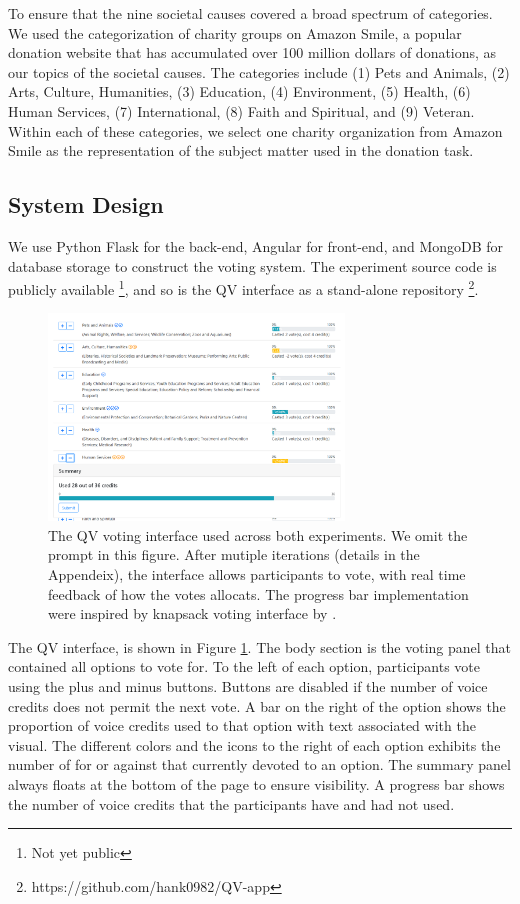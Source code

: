 To ensure that the nine societal causes 
covered a broad spectrum of categories.
We used the categorization of charity groups on Amazon Smile, 
a popular donation website that has accumulated over 100 million dollars of donations, 
as our topics of the societal causes.
The categories include (1) Pets and Animals, (2) Arts, Culture, Humanities, (3) Education, (4) Environment, 
(5) Health, (6) Human Services, (7) International, (8) Faith and Spiritual, and (9) Veteran. 
Within each of these categories, 
we select one charity organization from Amazon Smile 
as the representation of the subject matter used in the donation task.

\subsection{System Design}
We use Python Flask for the back-end, Angular for front-end, 
and MongoDB for database storage to construct the voting system. 
The experiment source code is publicly available \footnote{Not yet public}, 
and so is the QV interface as a stand-alone repository \footnote{https://github.com/hank0982/QV-app}.

\begin{figure}[htpb]
    \centering
    \includegraphics[width=0.7\textwidth, keepaspectratio=true]{content/image/qv-donation.png}
    \caption{
        The QV voting interface used across both experiments. 
        We omit the prompt in this figure.
        After mutiple iterations (details in the Appendeix), 
        the interface allows participants to vote, 
        with real time feedback of how the votes allocats. 
        The progress bar implementation 
        were inspired by knapsack voting interface by \textcite{goel2015knapsack}.
    }
    \label{fig:qv_donation}
\end{figure}

The QV interface, is shown in Figure \ref{fig:qv_donation}.
The body section is the voting panel
that contained all options to vote for.
To the left of each option, 
participants vote using the plus and minus buttons.
Buttons are disabled 
if the number of voice credits 
does not permit the next vote.
A bar on the right of the option 
shows the proportion of voice credits 
used to that option with text associated with the visual.
The different colors and the icons 
to the right of each option 
exhibits the number of for or against 
that currently devoted to an option.
The summary panel always 
floats at the bottom of the page 
to ensure visibility.
A progress bar shows the number of voice credits 
that the participants have and had not used.\par